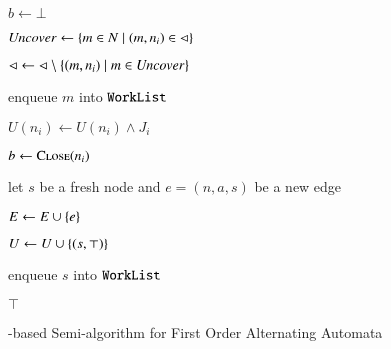 \begin{algorithm}[t!]
\begin{algorithmic}[1]
  \State $b \leftarrow \bot$



  \State $\mathit{Uncover} \leftarrow \{  m \in N \mid (m,n_i) \in \lhd  \}$
  
  \State $\lhd \leftarrow \lhd \setminus \{ (m,n_i) \mid m \in \mathit{Uncover} \}$


  \State enqueue $m$ into $\mathtt{WorkList}$
  
  \EndFor
  
  \State $U(n_i) \leftarrow U(n_i) \wedge J_i$


  \State $b \leftarrow \Call{Close}{n_i}$
  \label{ln:refine-end}

  \EndIf %

  \EndIf %

  \EndFor 

  \EndIf %


  \label{ln:expand-begin}

  \State let $s$ be a fresh node and $e = (n,a,s)$ be a new edge

  \State $E \leftarrow E \cup \{ e \}$
  \label{ln:edge-insert}

  \State $U \leftarrow U \cup \{ (s,\top) \}$

  \State enqueue $s$ into $\mathtt{WorkList}$
  \label{ln:expand-end}

  \EndFor

  \EndIf %

  \EndWhile  

   $\top$
\end{algorithmic}
\caption{\impact-based Semi-algorithm for First Order Alternating Automata}
\label{alg:impact}
\end{algorithm}

